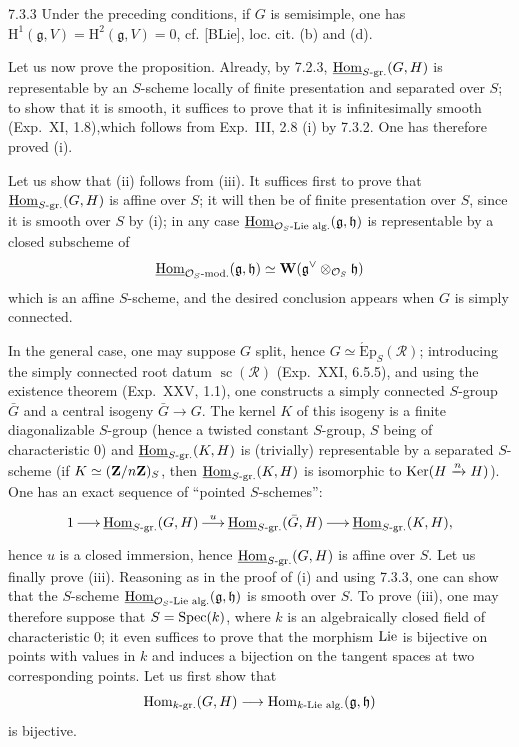 \begin{remark}{7.3.3}\label{XXIV.7.3.3}
Under the preceding conditions, if $G$ is semisimple, one has $\mathrm H^1(\mathfrak g,V)=\mathrm H^2(\mathfrak g,V)=0$, cf. [BLie], loc. cit. (b) and (d).
\end{remark}
\label{XXIV.7.3.4}
Let us now prove the proposition. Already, by 7.2.3, $\underline{\operatorname{Hom}}_{S\text{-gr.}}(G,H)$ is representable by an $S$-scheme locally of finite presentation and separated over $S$; to show that it is smooth, it suffices to prove that it is infinitesimally smooth (Exp.~XI, 1.8),which follows from Exp.~III, 2.8 (i) by 7.3.2. One has therefore proved (i).

Let us show that (ii) follows from (iii). It suffices first to prove that $\underline{\operatorname{Hom}}_{S\text{-gr.}}(G,H)$ is affine over $S$; it will then be of finite presentation over $S$, since it is smooth over $S$ by (i); in any case $\underline{\operatorname{Hom}}_{\mathcal{O}_S\text{-Lie alg.}}(\mathfrak g,\mathfrak h)$ is representable by a closed subscheme of
\[
\underline{\operatorname{Hom}}_{\mathcal{O}_S\text{-mod.}}(\mathfrak g,\mathfrak h)\simeq\mathbf W(\mathfrak g^\vee\otimes_{\mathcal{O}_S}\mathfrak h)
\]
which is an affine $S$-scheme, and the desired conclusion appears when $G$ is simply connected.

In the general case, one may suppose $G$ split, hence $G\simeq\operatorname{\acute Ep}_S(\mathscr R)$; introducing the simply connected root datum $\operatorname{sc}(\mathscr R)$ (Exp.~XXI, 6.5.5), and using the existence theorem (Exp.~XXV, 1.1), one constructs a simply connected $S$-group $\bar G$ and a central isogeny $\bar G\to G$. The kernel $K$ of this isogeny is a finite diagonalizable $S$-group (hence a twisted constant $S$-group, $S$ being of characteristic 0) and $\underline{\operatorname{Hom}}_{S\text{-gr.}}(K,H)$ is (trivially) representable by a separated $S$-scheme (if $K\simeq(\mathbf{Z}/n\mathbf{Z})_S$, then $\underline{\operatorname{Hom}}_{S\text{-gr.}}(K,H)$ is isomorphic to $\operatorname{Ker}(H\xrightarrow{n}H)$). One has an exact sequence of ``pointed $S$-schemes'':
\[
\xymatrix@C=1.5em{1\ar[r]&\underline{\Hom}_{S\text{-gr.}}(G,H)\ar[r]^u&\underline{\Hom}_{S\text{-gr.}}(\bar G,H)\ar[r]&\underline{\Hom}_{S\text{-gr.}}(K,H),}
\]
hence $u$ is a closed immersion, hence $\underline{\operatorname{Hom}}_{S\text{-gr.}}(G,H)$ is affine over $S$.
\label{XXIV.7.3.5}
Let us finally prove (iii). Reasoning as in the proof of (i) and using 7.3.3, one can show that the $S$-scheme $\underline{\operatorname{Hom}}_{\mathcal{O}_S\text{-Lie alg.}}(\mathfrak g,\mathfrak h)$ is smooth over $S$. To prove (iii), one may therefore suppose that $S=\operatorname{Spec}(k)$, where $k$ is an algebraically closed field of characteristic 0; it even suffices to prove that the morphism $\operatorname{Lie}$ is bijective on points with values in $k$ and induces a bijection on the tangent spaces at two corresponding points. Let us first show that
\[
\operatorname{Hom}_{k\text{-gr.}}(G,H)\longrightarrow\operatorname{Hom}_{k\text{-Lie alg.}}(\mathfrak g,\mathfrak h)
\]
is bijective.

